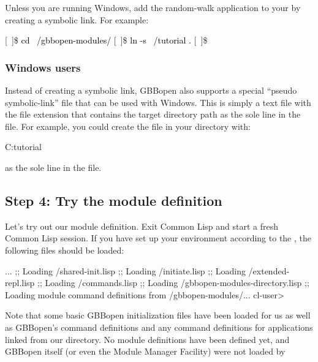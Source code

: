 \documentclass[10pt,twoside,english,pdftex]{article}
\begin{document}
Unless you are running Windows, add the random-walk application to your
 by creating a symbolic link.  For example:
%
\W\supp
\begin{example}
\textcolor{darkergray}{%
  [~]\$ \textcolor{black}{cd ~/gbbopen-modules/}
  [~]\$ \textcolor{black}{ln -s ~/tutorial .}
  [~]\$}
\end{example}

\subsubsection*{Windows users}

Instead of creating a symbolic link, GBBopen also supports a special ``pseudo
symbolic-link'' file that can be used with Windows.  This is simply a text
file with the file extension  that contains the target directory
path as the sole line in the file.  For example, you could create the file
 in your  directory
with:
%
\W\supp
\begin{example}
  C:\bkslash{}tutorial\bkslash
\end{example}
\T\vskip -12pt
%
as the sole line in the file.

\subsection*{Step 4: Try the  module definition}

Let's try out our module definition.  Exit Common Lisp and start a fresh
Common Lisp session.  If you have set up your environment according to the
,
the following files should be loaded:
%
\W\supp
\begin{example}
\textcolor{darkergray}{%
     ...
  ;; Loading /shared-init.lisp
  ;;   Loading /initiate.lisp
  ;;     Loading /extended-repl.lisp
  ;;     Loading /commands.lisp
  ;;     Loading /gbbopen-modules-directory.lisp
  ;; Loading module command definitions from /gbbopen-modules/...
  cl-user>}
\end{example}

Note that some basic GBBopen initialization files have been loaded for us as
well as GBBopen's command definitions and any command definitions for
applications linked from our 
directory. No module definitions have been defined yet, and GBBopen itself (or
even the Module Manager Facility) were not loaded by
\end{document}
